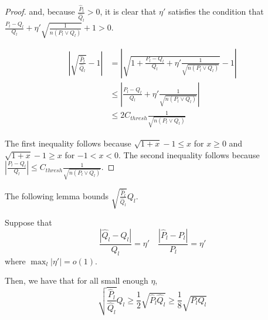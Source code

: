 \begin{proof}
and, because $\frac{\hat{P}_l}{\hat{Q}_l} > 0$,  it is clear that $\eta'$ satisfies the condition that $\frac{P_l - Q_l}{Q_l} + \eta'\sqrt{ \frac{1}{n (P_l \vee Q_l)} } + 1 > 0$. 



\begin{align*}
\left| \sqrt{ \frac{\hat{P}_l}{\hat{Q}_l} } - 1 \right| &= 
 \left|  \sqrt{ 1 + \frac{P_l - Q_l}{Q_l} + \eta' \frac{1}{\sqrt{n (P_l \vee Q_l)} }}
   -1  \right| \\
  &\leq \left| \frac{P_l - Q_l}{Q_l} + \eta' \frac{1}{\sqrt{ n (P_l \vee Q_l)}}        \right| \\
 &\leq 2 C_{thresh} \frac{1}{\sqrt{n (P_l \vee Q_l)} } 
\end{align*}

The first inequality follows because $ \sqrt{1 + x} - 1 \leq x$ for $x \geq 0$ and $\sqrt{ 1 + x} - 1 \geq x$ for $-1 < x < 0$. 
The second inequality follows because $\left| \frac{P_l - Q_l}{Q_l} \right| \leq C_{thresh} \frac{1}{\sqrt{n (P_l \vee Q_l)}} $. 

\end{proof}




The following lemma bounds $\sqrt{ \frac{\hat{P}_l}{\hat{Q}_l} } Q_l$. 
\begin{lemma}
\label{lem:sqrt_ratio_times_ql}
Suppose that
\[
\frac{|\hat{Q}_l - Q_l|}{Q_l} = \eta' \quad 
\frac{|\hat{P}_l - P_l|}{P_l} = \eta'
\]
where $\max_l |\eta'| = o(1)$. 


Then, we have that for all small enough $\eta$, 
\[
\sqrt{ \frac{\hat{P}_l}{\hat{Q}_l} } Q_l \geq \frac{1}{2} \sqrt{\hat{P}_l \hat{Q}_l} \geq
  \frac{1}{8} \sqrt{P_l Q_l}
\]
\end{lemma}


